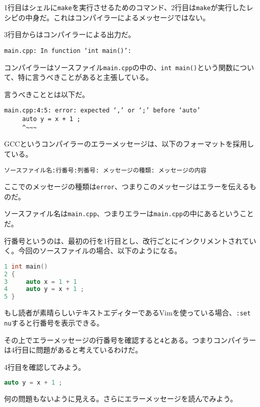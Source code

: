 1行目はシェルに\texttt{make}を実行させるためのコマンド、2行目は\texttt{make}が実行したレシピの中身だ。これはコンパイラーによるメッセージではない。

3行目からはコンパイラーによる出力だ。

\begin{lstlisting}[style=terminal]
main.cpp: In function ‘int main()’:
\end{lstlisting}

コンパイラーはソースファイル\texttt{main.cpp}の中の、\texttt{int main()}という関数について、特に言うべきことがあると主張している。

言うべきこととは以下だ。

\begin{lstlisting}[style=terminal]
main.cpp:4:5: error: expected ‘,’ or ‘;’ before ‘auto’
     auto y = x + 1 ;
     ^~~~
\end{lstlisting}

GCCというコンパイラーのエラーメッセージは、以下のフォーマットを採用している。

\begin{lstlisting}[style=grammar]
ソースファイル名:行番号:列番号: メッセージの種類: メッセージの内容
\end{lstlisting}

ここでのメッセージの種類は\texttt{error}、つまりこのメッセージはエラーを伝えるものだ。

ソースファイル名は\texttt{main.cpp}、つまりエラーは\texttt{main.cpp}の中にあるということだ。

行番号というのは、最初の行を1行目とし、改行ごとにインクリメントされていく。今回のソースファイルの場合、以下のようになる。

\begin{lstlisting}[language=c++]
1 int main()
2 {
3     auto x = 1 + 1 
4     auto y = x + 1 ;
5 }
\end{lstlisting}

もし読者が素晴らしいテキストエディターであるVimを使っている場合、\texttt{:set nu}すると行番号を表示できる。

その上でエラーメッセージの行番号を確認すると\texttt{4}とある。つまりコンパイラーは4行目に問題があると考えているわけだ。

4行目を確認してみよう。

\begin{lstlisting}[language=c++]
    auto y = x + 1 ;
\end{lstlisting}

何の問題もないように見える。さらにエラーメッセージを読んでみよう。

